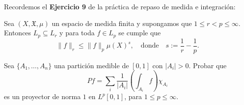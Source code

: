 \documentclass{article}
\theoremstyle{definition}
\newenvironment{ejercicio}[1]{\begin{trivlist}
\item[\hskip \labelsep {\bfseries Ejercicio}\hskip \labelsep {\bfseries #1.}]}{\end{trivlist}}
\begin{document}
\vspace{0.5cm}

Recordemos el \textbf{Ejercicio 9} de la práctica de repaso de medida e integración:

Sea \((X, \mathfrak{X}, \mu)\) un espacio de medida finita y supongamos que \(1 \le r < p \le \infty\). Entonces \(L_p \subseteq L_r\) y para toda \(f \in L_p\) se cumple que
\[
	\|f\|_r \le \|f\|_p {\mu(X)}^s, \quad \text{donde} \quad s := \frac{1}{r} - \frac{1}{p}.
\]

\begin{ejercicio}{4}
	Sea \( \{A_1, \dots, A_n\} \) una partición medible de \( [0,1] \) con \( |A_i| > 0 \). Probar que
	\[
		Pf = \sum_{i} \frac{1}{|A_i|} \left( \int_{A_i} f \right) \chi_{A_i}
	\]
	es un proyector de norma \( 1 \) en \( L^p[0,1] \), para \( 1 \le p \le \infty \).
\end{ejercicio}
\end{document}
